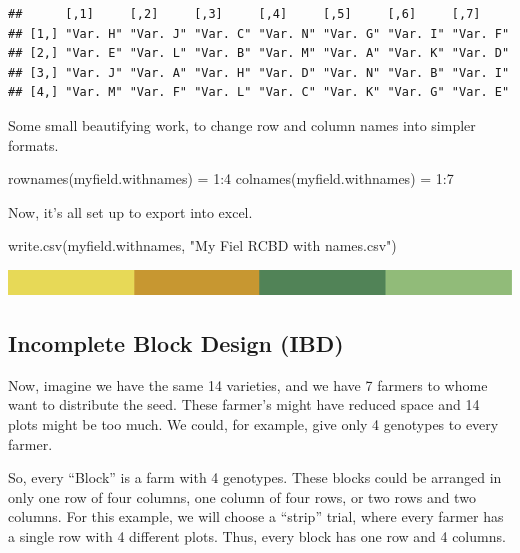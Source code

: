 \documentclass[
]{book}
\newenvironment{Shaded}{\begin{snugshade}}{\end{snugshade}}
\newcommand{\DecValTok}[1]{\textcolor[rgb]{0.00,0.00,0.81}{#1}}
\newcommand{\FunctionTok}[1]{\textcolor[rgb]{0.00,0.00,0.00}{#1}}
\newcommand{\NormalTok}[1]{#1}
\newcommand{\OtherTok}[1]{\textcolor[rgb]{0.56,0.35,0.01}{#1}}
\newcommand{\SpecialCharTok}[1]{\textcolor[rgb]{0.00,0.00,0.00}{#1}}
\newcommand{\StringTok}[1]{\textcolor[rgb]{0.31,0.60,0.02}{#1}}
\begin{document}
\begin{verbatim}
##      [,1]     [,2]     [,3]     [,4]     [,5]     [,6]     [,7]    
## [1,] "Var. H" "Var. J" "Var. C" "Var. N" "Var. G" "Var. I" "Var. F"
## [2,] "Var. E" "Var. L" "Var. B" "Var. M" "Var. A" "Var. K" "Var. D"
## [3,] "Var. J" "Var. A" "Var. H" "Var. D" "Var. N" "Var. B" "Var. I"
## [4,] "Var. M" "Var. F" "Var. L" "Var. C" "Var. K" "Var. G" "Var. E"
\end{verbatim}

Some small beautifying work, to change row and column names into simpler formats.

\begin{Shaded}
\begin{Highlighting}[]
\FunctionTok{rownames}\NormalTok{(myfield.withnames) }\OtherTok{=} \DecValTok{1}\SpecialCharTok{:}\DecValTok{4}
\FunctionTok{colnames}\NormalTok{(myfield.withnames) }\OtherTok{=} \DecValTok{1}\SpecialCharTok{:}\DecValTok{7}
\end{Highlighting}
\end{Shaded}

Now, it's all set up to export into excel.

\begin{Shaded}
\begin{Highlighting}[]
\FunctionTok{write.csv}\NormalTok{(myfield.withnames,}
          \StringTok{"My Fiel RCBD with names.csv"}\NormalTok{)}
\end{Highlighting}
\end{Shaded}

\includegraphics{rsrstrip.png}

\hypertarget{incomplete-block-design-ibd}{%
\subsection{Incomplete Block Design (IBD)}\label{incomplete-block-design-ibd}}

Now, imagine we have the same 14 varieties, and we have 7 farmers to whome want to distribute the seed. These farmer's might have reduced space and 14 plots might be too much. We could, for example, give only 4 genotypes to every farmer.

So, every ``Block'' is a farm with 4 genotypes. These blocks could be arranged in only one row of four columns, one column of four rows, or two rows and two columns. For this example, we will choose a ``strip'' trial, where every farmer has a single row with 4 different plots. Thus, every block has one row and 4 columns.
\end{document}
